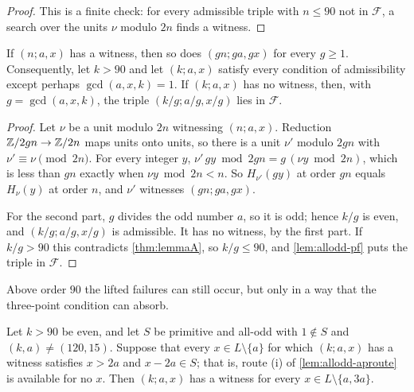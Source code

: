 \begin{proof}
This is a finite check: for every admissible triple with $n\le90$ not in
$\mathcal F$, a search over the units $\nu$ modulo $2n$ finds a witness.
\end{proof}

\begin{lemma}[lifting]
\label{lem:allodd-lift}
If $(n;a,x)$ has a witness, then so does $(gn;ga,gx)$ for every $g\ge1$.
Consequently, let $k>90$ and let $(k;a,x)$ satisfy every condition of
admissibility except perhaps $\gcd(a,x,k)=1$. If $(k;a,x)$ has no witness,
then, with $g=\gcd(a,x,k)$, the triple $(k/g;a/g,x/g)$ lies in $\mathcal F$.
\end{lemma}

\begin{proof}
Let $\nu$ be a unit modulo $2n$ witnessing $(n;a,x)$. Reduction
$\mathbb{Z}/2gn\to\mathbb{Z}/2n$ maps units onto units, so there is a unit $\nu'$ modulo $2gn$
with $\nu'\equiv \nu\pmod{2n}$. For every integer $y$,
$\nu'\,gy\bmod 2gn=g\,(\nu y\bmod2n)$, which is less than $gn$ exactly when
$\nu y\bmod 2n<n$. So $H_{\nu'}(gy)$ at order $gn$ equals $H_\nu(y)$
at order $n$, and $\nu'$ witnesses $(gn;ga,gx)$.

For the second part, $g$ divides the odd number $a$, so it is odd; hence
$k/g$ is even, and $(k/g;a/g,x/g)$ is admissible. It has no witness, by the
first part. If $k/g>90$ this contradicts \autoref{thm:lemmaA}, so $k/g\le90$,
and \autoref{lem:allodd-pf} puts the triple in $\mathcal F$.
\end{proof}

Above order $90$ the lifted failures can still occur, but only in a way that
the three-point condition can absorb.

\begin{lemma}
\label{lem:allodd-nofail}
Let $k>90$ be even, and let $S$ be primitive and all-odd with $1\notin S$ and
$(k,a)\ne(120,15)$. Suppose that every $x\in L\setminus\{a\}$ for which $(k;a,x)$ has
a witness satisfies $x>2a$ and $x-2a\in S$; that is, route (i) of
\autoref{lem:allodd-aproute} is available for no $x$. Then $(k;a,x)$ has a witness for
every $x\in L\setminus\{a,3a\}$.
\end{lemma}

